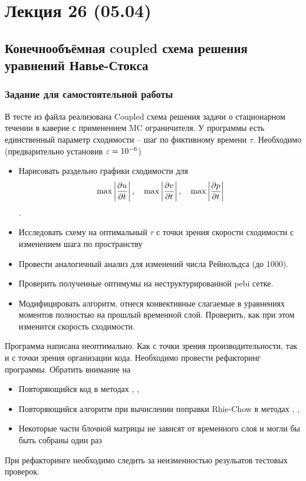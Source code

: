 \section{Лекция 26 (05.04)}
\subsection{Конечнообъёмная coupled схема решения уравнений Навье-Стокса}
\subsubsection{Задание для самостоятельной работы}
В тесте  из файла 
реализована Coupled схема решения задачи о стационарном течении в каверне
с применением MC ограничителя.
У программы есть единственный параметр сходимости -- шаг по фиктивному времени $\tau$.
Необходимо (предварительно установив $\varepsilon=10^{-6}$)
\begin{itemize}
\item  Нарисовать раздельно графики сходимости для 
       $$\max\left|\frac{\partial u}{\partial t}\right|,\quad
         \max\left|\frac{\partial v}{\partial t}\right|,\quad
         \max\left|\frac{\partial p}{\partial t}\right|$$. 
\item  Исследовать схему на оптимальный $\tau$ с точки зрения скорости сходимости с изменением шага по пространству
\item  Провести аналогичный анализ для изменений числа Рейнольдса (до 1000).
\item  Проверить полученные оптимумы на неструктурированной pebi сетке.
\item  Модифицировать алгоритм, отнеся конвективные слагаемые в уравнениях моментов полностью на прошлый временной слой.
       Проверить, как при этом изменится скорость сходимости.
\end{itemize}

Программа написана неоптимально. Как с точки зрения производительности, так и с точки зрения организации кода. Необходимо
провести рефакторинг программы. Обратить внимание на
\begin{itemize}
\item Повторяющийся код в методах , ,
\item Повторяющийся алгоритм при вычислении поправки Rhie-Chow в методах , ,
\item Некоторые части блочной матрицы не зависят от временного слоя и могли бы быть собраны один раз
\end{itemize}
При рефакторинге необходимо следить за неизменностью резульатов тестовых проверок.
